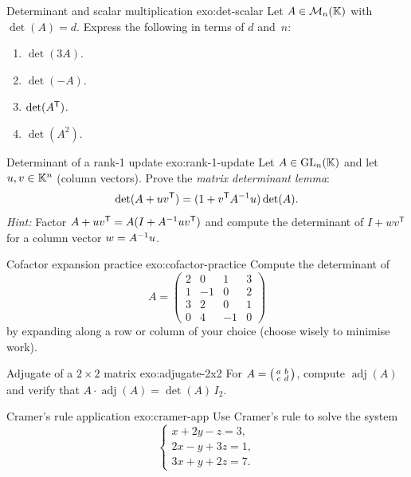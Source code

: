 \begin{exercise}{Determinant and scalar multiplication \basic}{exo:det-scalar}
Let $A\in\mathcal{M}_n({\mathbb{K}})$ with $\det(A)=d$. Express the following in terms
of $d$ and~$n$:
\begin{enumerate}[label=(\alph*)]
  \item $\det(3A)$.
  \item $\det(-A)$.
  \item $\det({A}^{\mathsf{T}})$.
  \item $\det(A^2)$.
\end{enumerate}
\end{exercise}

\begin{exercise}{Determinant of a rank-1 update \intermediate}{exo:rank-1-update}
Let $A\in\operatorname{GL}_n({\mathbb{K}})$ and let $u,v\in{\mathbb{K}}^n$ (column vectors). Prove
the \emph{matrix determinant lemma}:
\[
  \det(A + uv^{\mathsf{T}}) = (1 + v^{\mathsf{T}}{A}^{-1}u)\det(A).
\]
\textit{Hint:} Factor $A+uv^{\mathsf{T}} = A(I+{A}^{-1}uv^{\mathsf{T}})$
and compute the determinant of $I+wv^{\mathsf{T}}$ for a column
vector $w={A}^{-1}u$.
\end{exercise}

\begin{exercise}{Cofactor expansion practice \basic}{exo:cofactor-practice}
Compute the determinant of
\[
  A = \begin{pmatrix}
    2 & 0 & 1 & 3 \\
    1 & -1 & 0 & 2 \\
    3 & 2 & 0 & 1 \\
    0 & 4 & -1 & 0
  \end{pmatrix}
\]
by expanding along a row or column of your choice (choose wisely to
minimise work).
\end{exercise}

\begin{exercise}{Adjugate of a $2\times 2$ matrix \basic}{exo:adjugate-2x2}
For $A=\begin{psmallmatrix}a&b\\c&d\end{psmallmatrix}$, compute
$\operatorname{adj}(A)$ and verify that
$A\cdot\operatorname{adj}(A)=\det(A)\,I_2$.
\end{exercise}

\begin{exercise}{Cramer's rule application \intermediate}{exo:cramer-app}
Use Cramer's rule to solve the system
\[
  \begin{cases}
    x + 2y - z = 3,\\
    2x - y + 3z = 1,\\
    3x + y + 2z = 7.
  \end{cases}
\]
\end{exercise}

